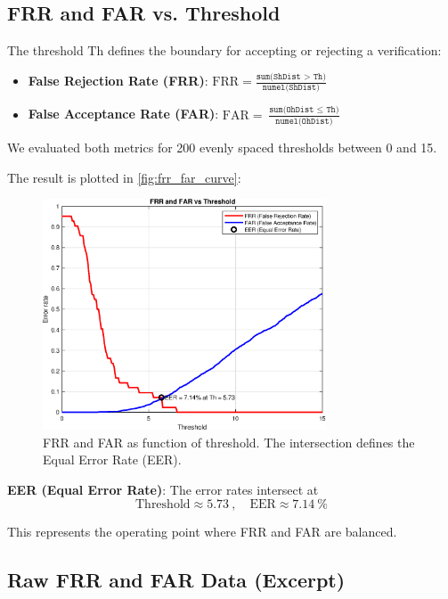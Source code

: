 \documentclass[a4paper,11pt]{article}
\begin{document}
\subsection{FRR and FAR vs. Threshold}

The threshold $\mathrm{Th}$ defines the boundary for accepting or rejecting a verification:
\begin{itemize}[noitemsep]
    \item \textbf{False Rejection Rate (FRR)}: \( \text{FRR} = \frac{\texttt{sum(ShDist > Th)}}{\texttt{numel(ShDist)}} \)
    \item \textbf{False Acceptance Rate (FAR)}: \( \text{FAR} = \frac{\texttt{sum(OhDist $\le$ Th)}}{\texttt{numel(OhDist)}} \)
\end{itemize}

\noindent
We evaluated both metrics for 200 evenly spaced thresholds between 0 and 15.

The result is plotted in \autoref{fig:frr_far_curve}:

\begin{figure}[H]
    \centering
    \includegraphics[width=0.75\textwidth]{figures/eer_plot.eps}
    \caption{FRR and FAR as function of threshold. The intersection defines the Equal Error Rate (EER).}
    \label{fig:frr_far_curve}
\end{figure}

\vspace{0.5em}
\noindent
\textbf{EER (Equal Error Rate)}: The error rates intersect at
\[
\text{Threshold} \approx \SI{5.73}{}, \quad \text{EER} \approx \SI{7.14}{\percent}
\]

This represents the operating point where FRR and FAR are balanced.

\subsection{Raw FRR and FAR Data (Excerpt)}
\end{document}
